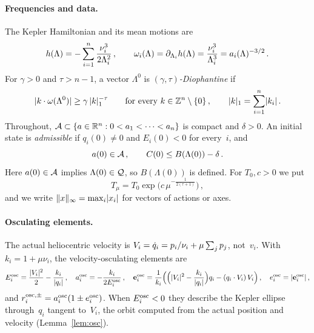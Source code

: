 \paragraph{Frequencies and data.} The Kepler Hamiltonian and its mean motions are
\begin{equation}\label{eq:freq}
h(\Lambda)=-\sum_{i=1}^n\frac{\nu_i^3}{2\Lambda_i^2}\,,\qquad \omega_i(\Lambda)=\partial_{\Lambda_i}h(\Lambda)=\frac{\nu_i^3}{\Lambda_i^3}=a_i(\Lambda)^{-3/2}\,.
\end{equation}
For $\gamma>0$ and $\tau>n-1$, a vector $\Lambda^0$ is \emph{$(\gamma,\tau)$-Diophantine} if
\begin{equation}\label{eq:dioph}
\lvert k\cdot\omega(\Lambda^0)\rvert\geq\gamma\,\lvert k\rvert_1^{-\tau}\qquad\mbox{for every } k\in\mathbb{Z}^n\setminus\{0\}\,,\qquad \lvert k\rvert_1=\sum_{i=1}^n\lvert k_i\rvert\,.
\end{equation}
Throughout, $\mathcal{A}\subset\{a\in\mathbb{R}^n:0<a_1<\cdots<a_n\}$ is compact and $\delta>0$. An initial state is \emph{admissible} if $q_i(0)\neq0$ and $E_i(0)<0$ for every~$i$, and
\begin{equation}\label{eq:hyp}
a(0)\in\mathcal{A}\,,\qquad C(0)\leq B(\Lambda(0))-\delta\,.
\end{equation}
Here $a(0)\in\mathcal{A}$ implies $\Lambda(0)\in\mathcal{Q}$, so $B(\Lambda(0))$ is defined. For $T_0,c>0$ we put
\begin{equation}\label{eq:time}
T_\mu=T_0\exp\big(c\,\mu^{-\frac{1}{2(\tau+1)}}\big)\,,
\end{equation}
and we write $\lVert x\rVert_\infty=\max_i\lvert x_i\rvert$ for vectors of actions or axes.

\paragraph{Osculating elements.} The actual heliocentric velocity is $V_i=\dot q_i=p_i/\nu_i+\mu\sum_jp_j$, not~$v_i$. With $k_i=1+\mu\nu_i$, the velocity-osculating elements are
\begin{equation*}
E_i^{\mathrm{osc}}=\frac{\lvert V_i\rvert^2}{2}-\frac{k_i}{\lvert q_i\rvert}\,,\quad a_i^{\mathrm{osc}}=-\frac{k_i}{2E_i^{\mathrm{osc}}}\,,\quad \mathbf{e}_i^{\mathrm{osc}}=\frac{1}{k_i}\Big(\Big(\lvert V_i\rvert^2-\frac{k_i}{\lvert q_i\rvert}\Big)q_i-(q_i\cdot V_i)\,V_i\Big)\,,\quad e_i^{\mathrm{osc}}=\lvert \mathbf{e}_i^{\mathrm{osc}}\rvert\,,
\end{equation*}
and $r_i^{\mathrm{osc},\pm}=a_i^{\mathrm{osc}}(1\pm e_i^{\mathrm{osc}})$. When $E_i^{\mathrm{osc}}<0$ they describe the Kepler ellipse through~$q_i$ tangent to~$V_i$, the orbit computed from the actual position and velocity (Lemma~\ref{lem:osc}).

